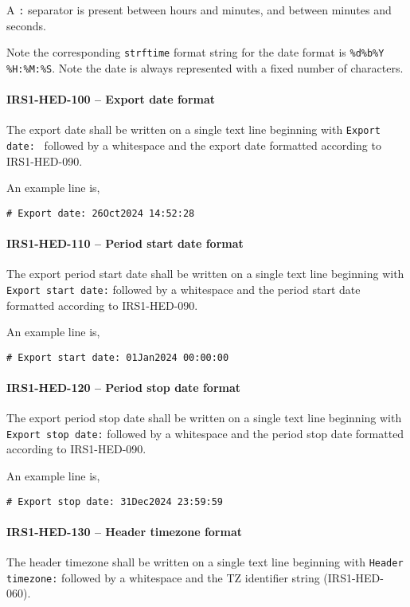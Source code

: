 A \lstinline{:} separator is present between hours and minutes, and between
minutes and seconds.

Note the corresponding \lstinline{strftime} format string for the date
format is \lstinline{%d%b%Y %H:%M:%S}. Note the date is always represented
with a fixed number of characters.

\paragraph{IRS1-HED-100 -- Export date format}
The export date shall be written on a single text line beginning with
\lstinline{Export date: } followed by a whitespace and the export date
formatted according to IRS1-HED-090.

An example line is,
\begin{lstlisting}[numbers=none]
  # Export date: 26Oct2024 14:52:28
\end{lstlisting}

\paragraph{IRS1-HED-110 -- Period start date format}
The export period start date shall be written on a single text line beginning
with \lstinline{Export start date:} followed by a whitespace and the period
start date formatted according to IRS1-HED-090.

An example line is,
\begin{lstlisting}[numbers=none]
  # Export start date: 01Jan2024 00:00:00
\end{lstlisting}

\paragraph{IRS1-HED-120 -- Period stop date format}
The export period stop date shall be written on a single text line beginning
with \lstinline{Export stop date:} followed by a whitespace and the period
stop date formatted according to IRS1-HED-090.

An example line is,
\begin{lstlisting}[numbers=none]
  # Export stop date: 31Dec2024 23:59:59
\end{lstlisting}

\paragraph{IRS1-HED-130 -- Header timezone format}
The header timezone shall be written on a single text line
beginning with \lstinline{Header timezone:} followed by a whitespace
and the TZ identifier string (IRS1-HED-060).

